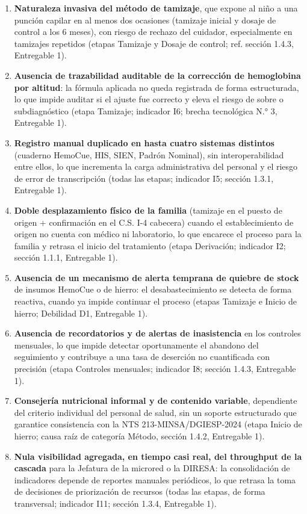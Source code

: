 \documentclass[11pt,a4paper]{article}
\providecommand{\tightlist}{%
  \setlength{\itemsep}{0pt}\setlength{\parskip}{0pt}}
\begin{document}
\begin{enumerate}
\def\labelenumi{\arabic{enumi}.}
\tightlist
\item
  \textbf{Naturaleza invasiva del método de tamizaje}, que expone al niño a una punción capilar en al menos dos ocasiones (tamizaje inicial y dosaje de control a los 6 meses), con riesgo de rechazo del cuidador, especialmente en tamizajes repetidos (etapas Tamizaje y Dosaje de control; ref. sección 1.4.3, Entregable 1).
\item
  \textbf{Ausencia de trazabilidad auditable de la corrección de hemoglobina por altitud}: la fórmula aplicada no queda registrada de forma estructurada, lo que impide auditar si el ajuste fue correcto y eleva el riesgo de sobre o subdiagnóstico (etapa Tamizaje; indicador I6; brecha tecnológica N.° 3, Entregable 1).
\item
  \textbf{Registro manual duplicado en hasta cuatro sistemas distintos} (cuaderno HemoCue, HIS, SIEN, Padrón Nominal), sin interoperabilidad entre ellos, lo que incrementa la carga administrativa del personal y el riesgo de error de transcripción (todas las etapas; indicador I5; sección 1.3.1, Entregable 1).
\item
  \textbf{Doble desplazamiento físico de la familia} (tamizaje en el puesto de origen + confirmación en el C.S. I-4 cabecera) cuando el establecimiento de origen no cuenta con médico ni laboratorio, lo que encarece el proceso para la familia y retrasa el inicio del tratamiento (etapa Derivación; indicador I2; sección 1.1.1, Entregable 1).
\item
  \textbf{Ausencia de un mecanismo de alerta temprana de quiebre de stock} de insumos HemoCue o de hierro: el desabastecimiento se detecta de forma reactiva, cuando ya impide continuar el proceso (etapas Tamizaje e Inicio de hierro; Debilidad D1, Entregable 1).
\item
  \textbf{Ausencia de recordatorios y de alertas de inasistencia} en los controles mensuales, lo que impide detectar oportunamente el abandono del seguimiento y contribuye a una tasa de deserción no cuantificada con precisión (etapa Controles mensuales; indicador I8; sección 1.4.3, Entregable 1).
\item
  \textbf{Consejería nutricional informal y de contenido variable}, dependiente del criterio individual del personal de salud, sin un soporte estructurado que garantice consistencia con la NTS 213-MINSA/DGIESP-2024 (etapa Inicio de hierro; causa raíz de categoría Método, sección 1.4.2, Entregable 1).
\item
  \textbf{Nula visibilidad agregada, en tiempo casi real, del throughput de la cascada} para la Jefatura de la microred o la DIRESA: la consolidación de indicadores depende de reportes manuales periódicos, lo que retrasa la toma de decisiones de priorización de recursos (todas las etapas, de forma transversal; indicador I11; sección 1.3.4, Entregable 1).
\end{enumerate}
\end{document}
